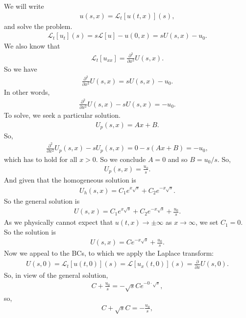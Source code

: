 \documentclass{book}
\theoremstyle{definition}
\newcommand{\p}{\partial}
\newcommand{\lag}{\mathcal{L}}
\newcommand{\f}[2]{\frac{#1}{#2}}
\newcommand{\ift}{\infty}
\begin{document}
We will write
\begin{align*}
u(s,x) = \lag_t[u(t,x)](s),
\end{align*}
and solve the problem. %
\begin{align*}
\lag_t[u_t](s) = s\lag[u] - u(0,x) = sU(s,x) - u_0.
\end{align*}
We also know that 
\begin{align*}
\lag_t[u_{xx}] = \f{\p^2}{\p x^2}U(s,x).
\end{align*}
So we have
\begin{align*}
\f{\p^2}{\p x^2}U(s,x) = sU(s,x) - u_0.
\end{align*}
In other words,
\begin{align*}
\f{\p^2}{\p x^2}U(s,x) - sU(s,x) =  - u_0.
\end{align*}
To solve, we seek a particular solution. 
\begin{align*}
U_p(s,x) = Ax + B.
\end{align*}
So,
\begin{align*}
\f{\p^2}{\p x^2}U_p(s,x) - sU_p(s,x) = 0 - s(Ax+B) = -u_0,
\end{align*}
which has to hold for all $x > 0$. So we conclude $A=0$ and so $B = u_0/s$. So,
\begin{align*}
U_p(s,x) = \f{u_0}{s}.
\end{align*}
And given that the homogeneous solution is
\begin{align*}
U_h(s,x) = C_1 e^{x\sqrt{s}} + C_2e^{-x\sqrt{s}}.
\end{align*}
So the general solution is
\begin{align*}
U(s,x) = C_1 e^{x\sqrt{s}} + C_2e^{-x\sqrt{s}} + \f{u_0}{s}.
\end{align*}
As we physically cannot expect that $u(t,x) \to \pm \ift$ as $x\to \infty$, we set $C_1 = 0$. So the solution is
\begin{align*}
U(s,x) = Ce^{-x\sqrt{s}} + \f{u_0}{s}.
\end{align*}
Now we appeal to the BCs, to which we apply the Laplace transform:
\begin{align*}
U(s,0) = \lag_t[u(t,0)](s) = \lag[u_x(t,0)](s) = \f{\p}{\p x}U(s,0).
\end{align*}
So, in view of the general solution,
\begin{align*}
C + \f{u_0}{s} = -\sqrt{s}Ce^{-0\cdot\sqrt{s}},
\end{align*}
so,
\begin{align*}
C + \sqrt{s}C = -\f{u_0}{s},
\end{align*}
\end{document}
